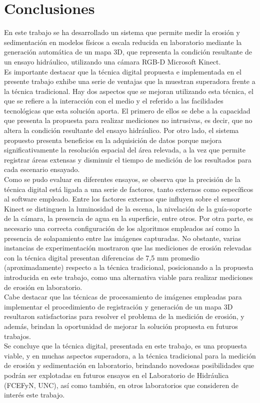 \chapter{Conclusiones}

En este trabajo se ha desarrollado un sistema que permite medir la erosión y sedimentación en modelos físicos a escala reducida en laboratorio mediante la generación automática de un mapa 3D, que representa la condición resultante de un ensayo hidráulico, utilizando una cámara RGB-D Microsoft Kinect. \\
Es importante destacar que la técnica digital propuesta e implementada en el presente trabajo exhibe una serie de ventajas que la muestran superadora frente a la técnica tradicional. Hay dos aspectos que se mejoran utilizando esta técnica, el que se refiere a la interacción con el medio y el referido a las facilidades tecnológicas que esta solución aporta. El primero de ellos se debe a la capacidad que presenta la propuesta para realizar mediciones no intrusivas, es decir, que no altera la condición resultante del ensayo hidráulico. Por otro lado, el sistema propuesto presenta beneficios en la adquisición de datos porque mejora significativamente la resolución espacial del área relevada, a la vez que permite registrar áreas extensas y disminuir el tiempo de medición de los resultados para cada escenario ensayado. \\
Como se pudo evaluar en diferentes ensayos, se observa que la precisión de la técnica digital está ligada a una serie de factores, tanto externos como específicos al software empleado. Entre los factores externos que influyen sobre el sensor Kinect se distinguen la luminosidad de la escena, la nivelación de la guía-soporte de la cámara, la presencia de agua en la superficie, entre otros. Por otra parte, es necesario una correcta configuración de los algoritmos empleados así como la presencia de solapamiento entre las imágenes capturadas. No obstante, varias instancias de experimentación mostraron que las mediciones de erosión relevadas con la técnica digital presentan diferencias de 7,5 mm promedio (aproximadamente) respecto a la técnica tradicional, posicionando a la propuesta introducida en este trabajo, como una alternativa viable para realizar mediciones de erosión en laboratorio. \\
Cabe destacar que las técnicas de procesamiento de imágenes empleadas para implementar el procedimiento de registración y generación de un mapa 3D  resultaron satisfactorias para resolver el problema de la medición de erosión, y además, brindan la oportunidad de mejorar la solución propuesta en futuros trabajos. \\
Se concluye que la técnica digital, presentada en este trabajo, es una propuesta viable, y en muchas aspectos superadora, a la técnica tradicional para la medición de erosión y sedimentación en laboratorio, brindando novedosas posibilidades que podrán ser explotadas en futuros ensayos en el Laboratorio de Hidráulica (FCEFyN, UNC), así como también, en otros laboratorios que consideren de interés este trabajo.